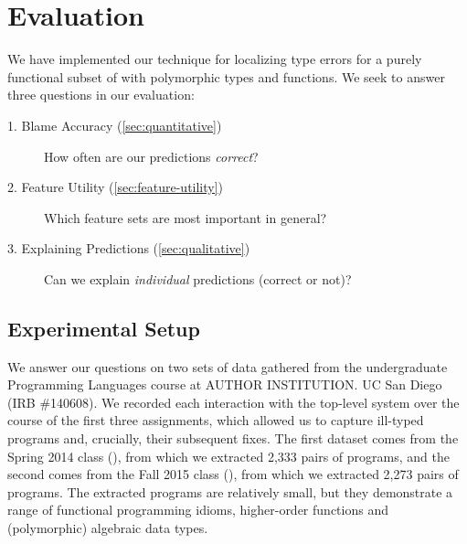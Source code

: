 \section{Evaluation}
\label{sec:evaluation}


We have implemented our technique for localizing type errors for a
purely functional subset of \ocaml with polymorphic types and functions.
%
We seek to answer three questions in our evaluation:
%
\begin{description}
\item[1. Blame Accuracy (\autoref{sec:quantitative})]
  How often are our predictions \emph{correct}?
\item[2. Feature Utility (\autoref{sec:feature-utility})]
  Which feature sets are most important in general?
\item[3. Explaining Predictions (\autoref{sec:qualitative})]
  Can we explain \emph{individual} predictions (correct or not)?
\end{description}

\subsection{Experimental Setup}
\label{sec:experimental-setup}

We answer our questions on two sets of data gathered from the
undergraduate Programming Languages course at
\if@anonymous
AUTHOR INSTITUTION.
\else
UC San Diego (IRB \#140608).
\fi
%
We recorded each interaction with the \ocaml top-level system over the
course of the first three assignments, which allowed us to capture
ill-typed programs and, crucially, their subsequent fixes.
%
The first dataset comes from the Spring 2014 class (\SPRING), from which
we extracted 2,333 pairs of programs, and the second comes from the Fall
2015 class (\FALL), from which we extracted 2,273 pairs of programs.
%
The extracted programs are relatively small, but they demonstrate a
range of functional programming idioms, \eg higher-order functions and
(polymorphic) algebraic data types.

